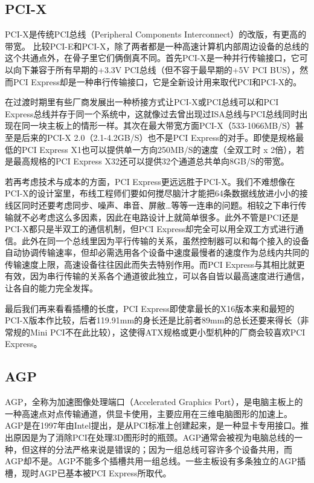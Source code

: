 \subsection{PCI-X}
PCI-X是传统PCI总线（Peripheral Components Interconnect）的改版，有更高的带宽。
比较PCI-E和PCI-X，除了两者都是一种高速计算机内部周边设备的总线的这个共通点外，在骨子里它们俩倒真不同。首先PCI-X是一种并行传输接口，它可以向下兼容于所有早期的+3.3V PCI总线（但不容于最早期的+5V PCI BUS），然而PCI Express却是一种串行传输接口，它是全新设计用来取代PCI和PCI-X的。

在过渡时期里有些厂商发展出一种桥接方式让PCI-X或PCI总线可以和PCI Express总线并存于同一个系统中，这就像过去曾出现过ISA总线与PCI总线同时出现在同一块主板上的情形一样。其次在最大带宽方面PCI-X（533-1066MB/S）甚至是后来的PCI-X 2.0（2.1-4.2GB/S）也不是PCI Express的对手。即使是规格最低的PCI Express X1也可以提供单一方向250MB/S的速度（全双工时 x 2倍），若是最高规格的PCI Express X32还可以提供32个通道总共单向8GB/S的带宽。

若再考虑技术与成本的方面，PCI Express更远远胜于PCI-X。我们不难想像在PCI-X的设计室里，布线工程师们要如何搅尽脑汁才能把64条数据线放进小小的接线区同时还要考虑同步、噪声、串音、屏敝…等等一连串的问题。相较之下串行传输就不必考虑这么多因素，因此在电路设计上就简单很多。此外不管是PCI还是PCI-X都只是半双工的通信机制，但PCI Express却完全可以用全双工方式进行通信。此外在同一个总线里因为平行传输的关系，虽然控制器可以和每个接入的设备自动协调传输速率，但却必需选用各个设备中速度最慢者的速度作为总线内共同的传输速度上限，高速设备往往因此而失去特别作用。而PCI Express与其相比就更有效，因为串行传输的关系各个通道彼此独立，可以各自皆以最高速度进行通信，让各自的能力完全发挥。

最后我们再来看看插槽的长度，PCI Express即使拿最长的X16版本来和最短的PCI-X版本作比较，后者119.91mm的身长还是比前者89mm的总长还要来得长（非常规的Mini PCI不在此比较），这使得ATX规格或更小型机种的厂商会较喜欢PCI Express。

\subsection{AGP}
AGP，全称为加速图像处理端口（Accelerated Graphics Port），是电脑主板上的一种高速点对点传输通道，供显卡使用，主要应用在三维电脑图形的加速上。AGP是在1997年由Intel提出，是从PCI标准上创建起来，是一种显卡专用接口。推出原因是为了消除PCI在处理3D图形时的瓶颈。AGP通常会被视为电脑总线的一种，但这样的分法严格来说是错误的；因为一组总线可容许多个设备共用，而AGP却不是。AGP不能多个插槽共用一组总线。一些主板设有多条独立的AGP插槽，现时AGP已基本被PCI Express所取代。

